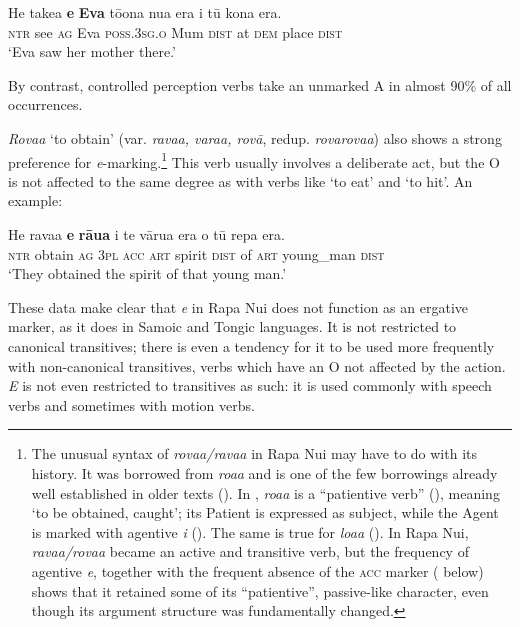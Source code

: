 \ea\label{ex:8.15}
\gll He take{\ꞌ}a \textbf{e} \textbf{Eva} tō{\ꞌ}ona nua era {\ꞌ}i tū kona era.\\
\textsc{ntr} see \textsc{ag} Eva \textsc{poss.3sg.o} Mum \textsc{dist} at \textsc{dem} place \textsc{dist}\\

\glt
‘Eva saw her mother there.’ \textstyleExampleref{[R210.086]} 
\z

By contrast, controlled perception verbs take an unmarked A in almost 90\% of all occurrences.

\textit{Rova{\ꞌ}a} ‘to obtain’ (var. \textit{rava{\ꞌ}a, vara{\ꞌ}a, rovā}, redup. \textit{rovarova{\ꞌ}a}) also shows a strong preference for \textit{e}{}-marking.\footnote{\label{fn:398}The unusual syntax of \textit{rova{\ꞌ}a/rava{\ꞌ}a} in Rapa Nui may have to do with its history. It was borrowed from  \textit{roa{\ꞌ}a} and is one of the few borrowings already well established in older texts (). In , \textit{roa{\ꞌ}a} is a “patientive verb” (\citealt[241]{LazardPeltzer2000}), meaning ‘to be obtained, caught’; its Patient is expressed as subject, while the Agent is marked with agentive \textit{i} (). The same is true for  \textit{loa{\ꞌ}a} (\citealt[50]{ElbertPukui1979}). In Rapa Nui, \textit{rava{\ꞌ}a/rova{\ꞌ}a} became an active and transitive verb, but the frequency of agentive \textit{e}, together with the frequent absence of the \textsc{acc} marker ( below) shows that it retained some of its “patientive”, passive-like character, even though its argument structure was fundamentally changed.} This verb usually involves a deliberate act, but the O is not affected to the same degree as with verbs like ‘to eat’ and ‘to hit’. An example:

\ea\label{ex:8.16}
\gll He rava{\ꞌ}a \textbf{e} \textbf{rāua} i te vārua era o tū repa era.\\
\textsc{ntr} obtain \textsc{ag} \textsc{3pl} \textsc{acc} \textsc{art} spirit \textsc{dist} of \textsc{art} young\_man \textsc{dist}\\

\glt 
‘They obtained the spirit of that young man.’ \textstyleExampleref{[R310.319]} 
\z

These data make clear that \textit{e} in Rapa Nui does not function as an ergative marker, as it does in Samoic and Tongic languages. It is not restricted to canonical transitives; there is even a tendency for it to be used more frequently with non-canonical transitives, verbs which have an O not affected by the action. \textit{E} is not even restricted to transitives as such: it is used commonly with speech verbs and sometimes with motion verbs.

